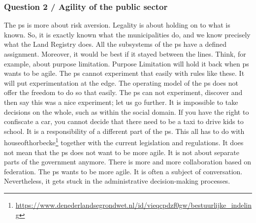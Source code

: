 \subsubsection{Question 2 / Agility of the public sector}
The \gls{ps} is more about risk aversion. Legality is about holding on to what is known. So, it is exactly known what the municipalities do, and we know precisely what the Land Registry does. All the subsystems of the \gls{ps} have a defined assignment. Moreover, it would be best if it stayed between the lines. Think, for example, about purpose limitation. Purpose Limitation will hold it back when \gls{ps} wants to be agile. The \gls{ps} cannot experiment that easily with rules like these. It will put experimentation at the edge.
The operating model of the \gls{ps} does not offer the freedom to do so that easily. The \gls{ps} can not experiment, discover and then say this was a nice experiment; let us go further. It is impossible to take decisions on the whole, such as within the social domain. If you have the right to confiscate a car, you cannot decide that there need to be a taxi to drive kids to school. It is a responsibility of a different part of the \gls{ps}. This all has to do with \gls{houseofthorbecke}\footnote{\url{https://www.denederlandsegrondwet.nl/id/vieqcpdzf0gw/bestuurlijke_indeling}} together with the current legislation and regulations. It does not mean that the \gls{ps} does not want to be more agile. It is not about separate parts of the government anymore. There is more and more collaboration based on federation. The \gls{ps} wants to be more agile. It is often a subject of conversation. Nevertheless, it gets stuck in the administrative decision-making processes.
